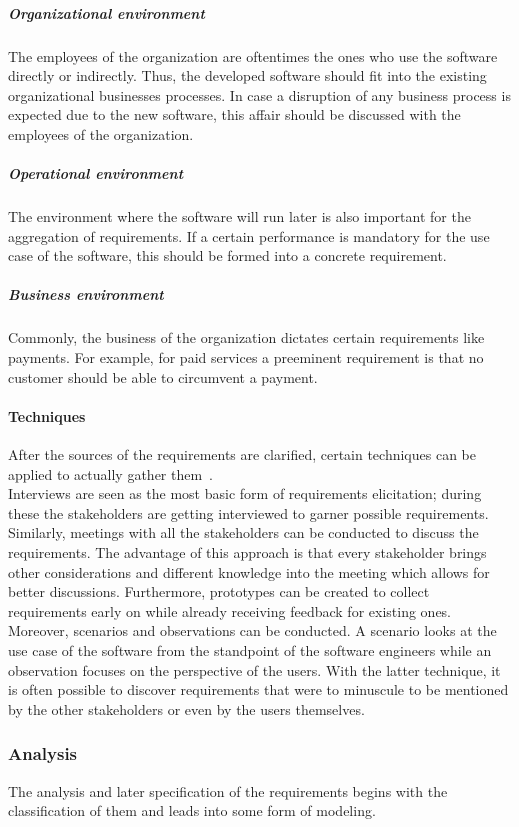 \documentclass[12pt,a4paper]{report}
\begin{document}
\subparagraph{Organizational environment}
The employees of the organization are oftentimes the ones who use the software
directly or indirectly. Thus, the developed software should fit into the existing
organizational businesses processes. In case a disruption of any business process
is expected due to the new software, this affair should be discussed with the
employees of the organization.

\subparagraph{Operational environment}
The environment where the software will run later is also important for the
aggregation of requirements. If a certain performance is mandatory for the use case
of the software, this should be formed into a concrete requirement.

\subparagraph{Business environment}
Commonly, the business of the organization dictates certain requirements like
payments. For example, for paid services a preeminent requirement is that
no customer should be able to circumvent a payment.


\paragraph{Techniques}
After the sources of the requirements are clarified, certain techniques can be
applied to actually gather them~\cite{sommerville-se, swebok}.\\
Interviews are seen as the most basic form of requirements elicitation;
during these the stakeholders are getting interviewed to garner possible requirements.
Similarly, meetings with all the stakeholders can be conducted to discuss the requirements.
The advantage of this approach is that every stakeholder brings other considerations and
different knowledge into the meeting which allows for better discussions.
Furthermore, prototypes can be created to collect requirements early on while already
receiving feedback for existing ones. Moreover, scenarios and observations can be
conducted. A scenario looks at the use case of the software from the standpoint
of the software engineers while an observation focuses on the perspective of the
users. With the latter technique, it is often possible to discover requirements
that were to minuscule to be mentioned by the other stakeholders or even by the users themselves.


\subsubsection{Analysis}

The analysis and later specification of the requirements begins with the classification
of them and leads into some form of modeling.
\end{document}
